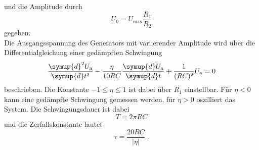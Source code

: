 und die Amplitude durch 
\begin{equation}
    U_0 = U_\text{max} \frac{R_1}{R_2}
\end{equation}
gegeben. \\
Die Ausgangsspannung des Generators mit variierender Amplitude wird über die Differentialgleichung einer gedämpften Schwingung
\begin{equation}
    \frac{\symup{d}^2 U_\text{a}}{\symup{d}t^2} - \frac{\eta}{10RC}\frac{\symup{d}U_\text{a}}{\symup{d}t} + \frac{1}{(RC)^2}U_\text{a} = 0
\end{equation}
beschrieben. Die Konstante $-1 \leq \eta \leq 1$ ist dabei über $R_1$ einstellbar. 
Für $\eta < 0$ kann eine gedämpfte Schwingung gemessen werden, für $\eta > 0$ oszilliert das System.
Die Schwingungsdauer ist dabei 
\begin{equation}
    T = 2 \pi RC 
    \label{eq:T}
\end{equation}
und die Zerfallskonstante lautet
\begin{equation}
    \tau = \frac{20 RC}{|\eta|} \; .
\end{equation}
